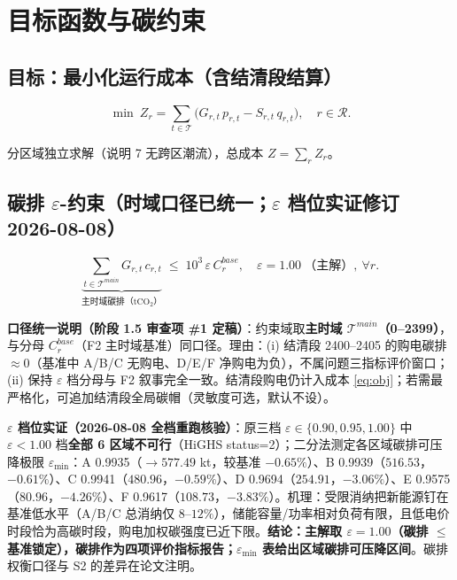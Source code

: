 \documentclass{internal-report}
\begin{document}
\section{目标函数与碳约束}

\subsection{目标：最小化运行成本（含结清段结算）}

\begin{equation}
  \min\ Z_r = \sum_{t\in\mathcal{T}} \big( G_{r,t}\,p_{r,t} - S_{r,t}\,q_{r,t} \big),\quad r\in\mathcal{R}.
  \label{eq:obj}
\end{equation}

分区域独立求解（说明 7 无跨区潮流），总成本 $Z=\sum_r Z_r$。

\subsection{碳排 $\varepsilon$-约束（时域口径已统一；$\varepsilon$ 档位实证修订 2026-08-08）}

\begin{equation}
  \underbrace{\sum_{t\in\mathcal{T}^{main}} G_{r,t}\,c_{r,t}}_{\text{主时域碳排（tCO$_2$）}}
  \;\le\; 10^3\,\varepsilon\, C^{base}_r,\quad
  \varepsilon = 1.00\ \text{（主解）},\ \forall r.
  \label{eq:carbon}
\end{equation}

\textbf{口径统一说明（阶段 1.5 审查项 \#1 定稿）}：约束域取\textbf{主时域 $\mathcal{T}^{main}$（0--2399）}，与分母 $C^{base}_r$（F2 主时域基准）同口径。理由：(i) 结清段 2400--2405 的购电碳排 $\approx 0$（基准中 A/B/C 无购电、D/E/F 净购电为负），不属问题三指标评价窗口；(ii) 保持 $\varepsilon$ 档分母与 F2 叙事完全一致。结清段购电仍计入成本 \eqref{eq:obj}；若需最严格化，可追加结清段全局碳帽（灵敏度可选，默认不设）。

\textbf{$\varepsilon$ 档位实证（2026-08-08 全档重跑核验）}：原三档 $\varepsilon\in\{0.90,0.95,1.00\}$ 中 $\varepsilon<1.00$ 档\textbf{全部 6 区域不可行}（HiGHS status=2）；二分法测定各区域碳排可压降极限 $\varepsilon_{\min}$：A 0.9935（$\to577.49$ kt，较基准 $-0.65\%$）、B 0.9939（$516.53$，$-0.61\%$）、C 0.9941（$480.96$，$-0.59\%$）、D 0.9694（$254.91$，$-3.06\%$）、E 0.9575（$80.96$，$-4.26\%$）、F 0.9617（$108.73$，$-3.83\%$）。机理：受限消纳把新能源钉在基准低水平（A/B/C 总消纳仅 $8$--$12\%$），储能容量/功率相对负荷有限，且低电价时段恰为高碳时段，购电加权碳强度已近下限。\textbf{结论：主解取 $\varepsilon=1.00$（碳排 $\le$ 基准锁定），碳排作为四项评价指标报告；$\varepsilon_{\min}$ 表给出区域碳排可压降区间}。碳排权衡口径与 S2 的差异在论文注明。
\end{document}
